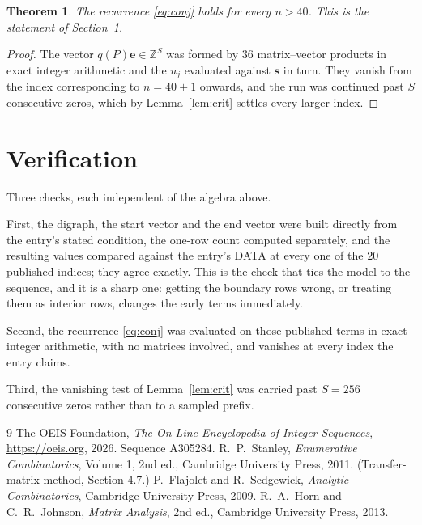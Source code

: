 \documentclass[11pt,a4paper]{article}
\theoremstyle{plain}
\newtheorem{theorem}{Theorem}
\theoremstyle{definition}
\begin{document}
\begin{theorem}
The recurrence \eqref{eq:conj} holds for every $n>40$. This is the statement of
Section~1.
\end{theorem}

\begin{proof}
The vector $q(P)\mathbf{e}\in\mathbb{Z}^{S}$ was formed by $36$ matrix--vector
products in exact integer arithmetic and the $u_j$ evaluated against $\mathbf{s}$ in turn.
They vanish from the index corresponding to $n=40+1$ onwards, and the run was continued
past $S$ consecutive zeros, which by Lemma~\ref{lem:crit} settles every larger index.
\end{proof}

\section{Verification}

Three checks, each independent of the algebra above.

First, the digraph, the start vector and the end vector were built directly from the
entry's stated condition, the one-row count computed separately, and the resulting values
compared against the entry's DATA at every one of the $20$ published indices; they
agree exactly. This is the check that ties the model to the sequence, and it is a sharp one:
getting the boundary rows wrong, or treating them as interior rows, changes the early terms
immediately.

Second, the recurrence \eqref{eq:conj} was evaluated on those published terms in exact
integer arithmetic, with no matrices involved, and vanishes at every index the entry claims.

Third, the vanishing test of Lemma~\ref{lem:crit} was carried past $S=256$ consecutive
zeros rather than to a sampled prefix.

\begin{thebibliography}{9}
 The OEIS Foundation, \emph{The On-Line Encyclopedia of Integer
Sequences}, \url{https://oeis.org}, 2026. Sequence A305284.
 R.~P.~Stanley, \emph{Enumerative Combinatorics}, Volume 1, 2nd ed.,
Cambridge University Press, 2011. (Transfer-matrix method, Section 4.7.)
 P.~Flajolet and R.~Sedgewick, \emph{Analytic Combinatorics}, Cambridge
University Press, 2009.
 R.~A.~Horn and C.~R.~Johnson, \emph{Matrix Analysis}, 2nd ed., Cambridge
University Press, 2013.
\end{thebibliography}
\end{document}
